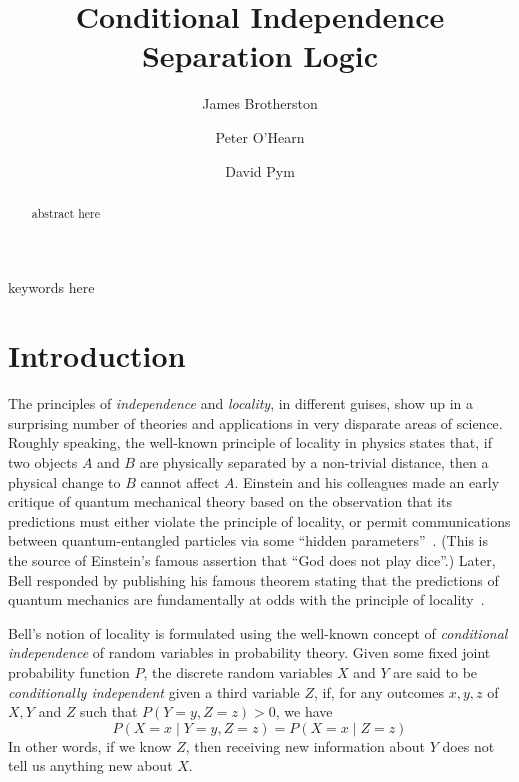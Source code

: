\documentclass[envcountsame,envcountsect]{llncs}
\theoremstyle{plain}
\begin{document}
\title{Conditional Independence Separation Logic}

\author{James Brotherston \and Peter O'Hearn
\and David Pym}


\maketitle

\begin{abstract}
abstract here
\end{abstract}

\keywords keywords here



\section{Introduction}
\label{sec:introduction}

The principles of \emph{independence} and \emph{locality}, in different guises, show up in a surprising number of theories and applications in very disparate areas of science.  Roughly speaking, the well-known principle of locality in physics states that, if two objects $A$ and $B$ are physically separated by a non-trivial distance, then a physical change to $B$ cannot affect $A$.  Einstein and his colleagues made an early critique of quantum mechanical theory based on the observation that its predictions must either violate the principle of locality, or permit communications between quantum-entangled particles via some ``hidden parameters''~\cite{Einstein-Podolsky-Rosen:35}.  (This is the source of Einstein's famous assertion that ``God does not play dice''.) Later, Bell responded by publishing his famous theorem stating that the predictions of quantum mechanics are fundamentally at odds with the principle of locality~\cite{Bell:64}.

Bell's notion of locality is formulated using the well-known concept of \emph{conditional independence} of random variables in probability theory.  Given some fixed joint probability function $P$, the discrete random variables $X$ and $Y$ are said to be \emph{conditionally independent} given a third variable $Z$, if, for any outcomes $x,y,z$ of $X,Y$ and $Z$ such that \mbox{$P(Y=y,Z=z) > 0$}, we have
\[
P(X = x \mid Y=y, Z=z) = P(X=x \mid Z=z)
\]
In other words, if we know $Z$, then receiving new information about $Y$ does not tell us anything new about $X$.
\end{document}
